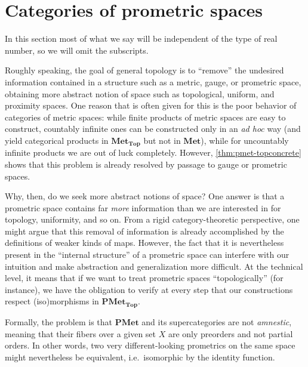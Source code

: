\documentclass{article}
\def\PMet{\mathbf{PMet}}
\def\Met{\mathbf{Met}}
\def\MetTop{\mathbf{Met}_{\mathbf{Top}}}
\def\PMetTop{\mathbf{PMet}_{\mathbf{Top}}}
\begin{document}
\section{Categories of prometric spaces}
\label{sec:sub-promet}

In this section most of what we say will be independent of the type of real number, so we will omit the subscripts.

Roughly speaking, the goal of general topology is to ``remove'' the undesired information contained in a structure such as a metric, gauge, or prometric space, obtaining more abstract notion of space such as topological, uniform, and proximity spaces.
One reason that is often given for this is the poor behavior of categories of metric spaces: while finite products of metric spaces are easy to construct, countably infinite ones can be constructed only in an \textit{ad hoc} way (and yield categorical products in $\MetTop$ but not in $\Met$), while for uncountably infinite products we are out of luck completely.
However, \cref{thm:pmet-topconcrete} shows that this problem is already resolved by passage to gauge or prometric spaces.

Why, then, do we seek more abstract notions of space?
One answer is that a prometric space contains far \emph{more} information than we are interested in for topology, uniformity, and so on.
From a rigid category-theoretic perspective, one might argue that this removal of information is already accomplished by the definitions of weaker kinds of maps.
However, the fact that it is nevertheless present in the ``internal structure'' of a prometric space can interfere with our intuition and make abstraction and generalization more difficult.
At the technical level, it means that if we want to treat prometric spaces ``topologically'' (for instance), we have the obligation to verify at every step that our constructions respect (iso)morphisms in $\PMetTop$.

Formally, the problem is that $\PMet$ and its supercategories are not \emph{amnestic}, meaning that their fibers over a given set $X$ are only preorders and not partial orders.
In other words, two very different-looking prometrics on the same space might nevertheless be equivalent, i.e.\ isomorphic by the identity function.
\end{document}
